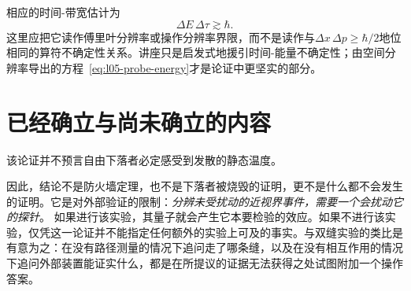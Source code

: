 \begin{classroomqa}
\end{classroomqa}

\begin{classroomqa}
\end{classroomqa}

相应的时间-带宽估计为
\begin{equation}
\Delta E\,\Delta\tau\gtrsim\hbar.
\end{equation}
这里应把它读作傅里叶分辨率或操作分辨率界限，而不是读作与\(\Delta x\,\Delta p\geq\hbar/2\)地位相同的算符不确定性关系。讲座只是启发式地援引时间-能量不确定性；由空间分辨率导出的方程~\eqref{eq:l05-probe-energy}才是论证中更坚实的部分。

\begin{classroomqa}
\end{classroomqa}

\enlargethispage{2\baselineskip}
\section{已经确立与尚未确立的内容}

该论证并不预言自由下落者必定感受到发散的静态温度。

\begin{classroomqa}
\end{classroomqa}

因此，结论不是防火墙定理，也不是下落者被烧毁的证明，更不是什么都不会发生的证明。它是对外部验证的限制：\emph{分辨未受扰动的近视界事件，需要一个会扰动它的探针}。
如果进行该实验，其量子就会产生它本要检验的效应。如果不进行该实验，仅凭这一论证并不能指定任何额外的实验上可及的事实。与双缝实验的类比是有意为之：在没有路径测量的情况下追问走了哪条缝，以及在没有相互作用的情况下追问外部装置能证实什么，都是在所提议的证据无法获得之处试图附加一个操作答案。
